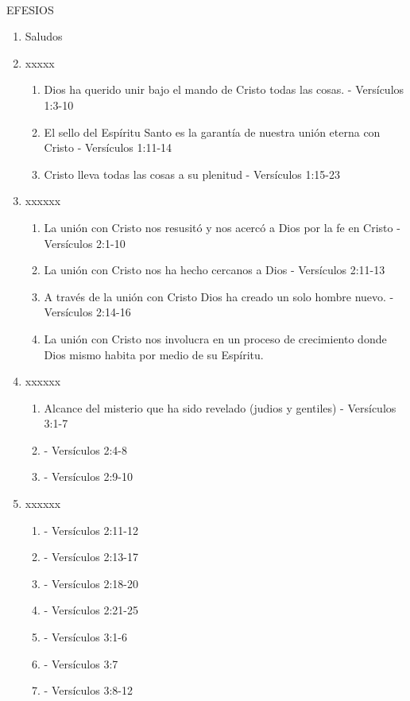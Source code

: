 \documentclass[9pt,letterpaper]{article}
\author{Ciencias}
\begin{document}
	\\
	{\large EFESIOS}\\
	
	\begin{enumerate}
		\item Saludos
		\item  xxxxx
		\begin{enumerate}
			\item Dios ha querido unir bajo el mando de Cristo todas las cosas. - Versículos 1:3-10
			\item El sello del Espíritu Santo es la garantía de nuestra unión eterna con Cristo - Versículos 1:11-14
			\item Cristo lleva todas las cosas a su plenitud - Versículos 1:15-23
		\end{enumerate}
		\item xxxxxx
		\begin{enumerate}
			\item La unión con Cristo nos resusitó y nos acercó a Dios por la fe en Cristo - Versículos 2:1-10
			\item La unión con Cristo nos ha hecho cercanos a Dios - Versículos 2:11-13
			\item A través de la unión con Cristo Dios ha creado un solo hombre nuevo. - Versículos 2:14-16
			\item La unión con Cristo nos involucra en un proceso de crecimiento donde Dios mismo habita por medio de su Espíritu.
		\end{enumerate}
		\item xxxxxx
		\begin{enumerate}
			\item Alcance del misterio que ha sido revelado (judios y gentiles) - Versículos 3:1-7
			\item  - Versículos 2:4-8
			\item  - Versículos 2:9-10
		\end{enumerate}
		\item xxxxxx
		\begin{enumerate}
			\item  - Versículos 2:11-12
			\item  - Versículos 2:13-17
			\item  - Versículos 2:18-20
			\item  - Versículos 2:21-25
			\item  - Versículos 3:1-6
			\item  - Versículos 3:7
			\item  - Versículos 3:8-12

\end{enumerate}
\end{enumerate}
\end{document}
